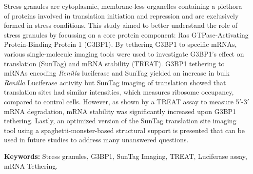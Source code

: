 Stress granules are cytoplasmic, membrane-less organelles containing a plethora of proteins involved in translation initiation and repression and are exclusively formed in stress conditions.
This study aimed to better understand the role of stress granules by focussing on a core protein component: Ras GTPase-Activating Protein-Binding Protein 1 (G3BP1).
By tethering G3BP1 to specific mRNAs, various single-molecule imaging tools were used to investigate G3BP1's effect on translation (SunTag) and mRNA stability (TREAT).
G3BP1 tethering to mRNAs encoding \textit{Renilla} luciferase and SunTag yielded an increase in bulk \textit{Renilla} Luciferase activity but SunTag imaging of translation showed that translation sites had similar intensities, which measures ribosome occupancy, compared to control cells.
However, as shown by a TREAT assay to measure 5$'$-3$'$ mRNA degradation, mRNA stability was significantly increased upon G3BP1 tethering.
Lastly, an optimized version of the SunTag translation site imaging tool using a spaghetti-monster-based structural support is presented that can be used in future studies to address many unanswered questions.

\noindent
\textbf{Keywords:}
Stress granules, G3BP1, SunTag Imaging, TREAT, Luciferase assay, mRNA Tethering.
